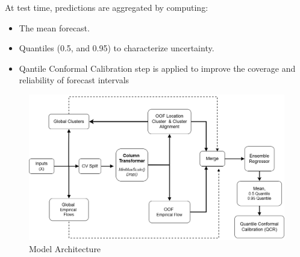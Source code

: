 \documentclass[ruler]{CUP-JNL-EDS}%
\begin{document}
\noindent At test time, predictions are aggregated by computing:
\begin{itemize}
    \item The mean forecast.
    \item Quantiles (0.5, and 0.95) to characterize uncertainty.
    \item Qantile Conformal Calibration step is applied to improve the coverage and reliability of forecast intervals
\end{itemize}

\begin{figure}[htbp]
    \centering
    \includegraphics[width=1.0\textwidth]{./assets/model_2.png}
    \caption{Model Architecture}
    \label{fig:model_diagram}
\end{figure}
\end{document}
